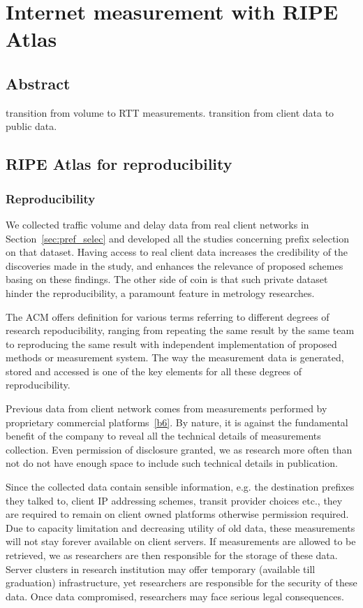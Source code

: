 \chapter{Internet measurement with RIPE Atlas}
\label{sec:ripe_atlas}
\section*{Abstract}
transition from volume to RTT measurements.
transition from client data to public data.


\section{RIPE Atlas for reproducibility}
\subsection{Reproducibility}
We collected traffic volume and delay data from real client networks in Section~\ref{sec:pref_selec} and developed all the studies concerning prefix selection on that dataset.
Having access to real client data increases the credibility of the discoveries made in the study, and enhances the relevance of proposed schemes basing on these findings.
The other side of coin is that such private dataset hinder the reproducibility, a paramount feature in metrology researches.

The \acf{ACM} offers definition for various terms referring to different degrees of research repoducibility, ranging from repeating the same result by the same team to reproducing the same result with independent implementation of proposed methods or measurement system.
The way the measurement data is generated, stored and accessed is one of the key elements for all these degrees of reproducibility.

Previous data from client network comes from measurements performed by proprietary commercial platforms~\ref{b6}.
By nature, it is against the fundamental benefit of the company to reveal all the technical details of measurements collection. Even permission of disclosure granted, we as research more often than not do not have enough space to include such technical details in publication.

Since the collected data contain sensible information, e.g. the destination prefixes they talked to, client IP addressing schemes, transit provider choices etc., they are required to remain on client owned platforms otherwise permission required. Due to capacity limitation and decreasing utility of old data, these measurements will not stay forever available on client servers. If measurements are allowed to be retrieved, we as researchers are then responsible for the storage of these data. Server clusters in research institution may offer temporary (available till graduation) infrastructure, yet researchers are responsible for the security of these data. Once data compromised, researchers may face serious legal consequences.

